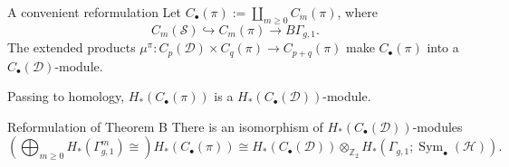 \documentclass[10pt]{beamer}
\newcommand{\Z}{\mathbb{Z}}
\renewcommand{\H}{\mathcal{H}}
\newcommand{\D}{\mathcal{D}}
\renewcommand{\S}{\mathcal{S}}
\renewcommand{\gg}{\Gamma_{g,1}}
\newcommand{\ggm}{\Gamma_{g,1}^m}
\newcommand{\Cb}{C_{\bullet}}
\newcommand{\pa}[1]{\left(#1\right)}
\DeclareMathOperator{\Sym}{Sym}
\begin{document}
\begin{frame}{A convenient reformulation}
Let $\Cb(\pi):=\coprod_{m\geq 0} C_m(\pi)$, where
\[
 C_m(\S)\hookrightarrow C_m(\pi)\to B\gg.
\]
\pause
The extended products $ \mu^{\pi}\colon C_p(\D)\times C_q(\pi)\to C_{p+q}(\pi)$
 make $\Cb(\pi)$
into a $\Cb(\D)$-module.

\pause
\vspace{0.3cm}
Passing to homology, $H_*(\Cb(\pi))$ is a $H_*(\Cb(\D))$-module.

\pause
\begin{block}{Reformulation of Theorem B}
There is an isomorphism of $H_*(\Cb(\D))$-modules
\[
 \pa{\bigoplus_{m\geq 0}H_*(\ggm)\cong} H_*(\Cb(\pi))\cong H_*(\Cb(\D))\otimes_{\Z_2} H_*(\gg;\Sym_{\bullet}(\H)).
\]
\end{block}
\vspace{0.5cm}
\pause
{}


\end{frame}
\end{document}
